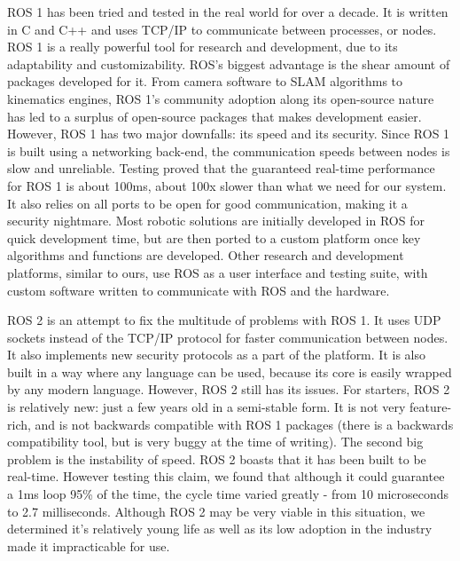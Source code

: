         ROS 1 has been tried and tested in the real world for over a decade. It is written in C and C++ and uses TCP/IP to communicate between processes, or nodes. ROS 1 is a really powerful tool for research and development, due to its adaptability and customizability. ROS's biggest advantage is the shear amount of packages developed for it. From camera software to SLAM algorithms to kinematics engines, ROS 1's community adoption along its open-source nature has led to a surplus of open-source packages that makes development easier. However, ROS 1 has two major downfalls: its speed and its security. Since ROS 1 is built using a networking back-end, the communication speeds between nodes is slow and unreliable. Testing proved that the guaranteed real-time performance for ROS 1 is about 100ms, about 100x slower than what we need for our system. It also relies on all ports to be open for good communication, making it a security nightmare. Most robotic solutions are initially developed in ROS for quick development time, but are then ported to a custom platform once key algorithms and functions are developed. Other research and development platforms, similar to ours, use ROS as a user interface and testing suite, with custom software written to communicate with ROS and the hardware.

        ROS 2 is an attempt to fix the multitude of problems with ROS 1. It uses UDP sockets instead of the TCP/IP protocol for faster communication between nodes. It also implements new security protocols as a part of the platform. It is also built in a way where any language can be used, because its core is easily wrapped by any modern language. 
        However, ROS 2 still has its issues. For starters, ROS 2 is relatively new: just a few years old in a semi-stable form. It is not very feature-rich, and is not backwards compatible with ROS 1 packages (there is a backwards compatibility tool, but is very buggy at the time of writing). The second big problem is the instability of speed. ROS 2 boasts that it has been built to be real-time. However testing this claim, we found that although it could guarantee a 1ms loop 95\% of the time, the cycle time varied greatly - from 10 microseconds to 2.7 milliseconds. Although ROS 2 may be very viable in this situation, we determined it's relatively young life as well as its low adoption in the industry made it impracticable for use.

